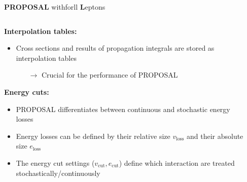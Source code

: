 \begin{frame}{}
  \vspace{-3cm}
  \begin{minipage}[t][1cm][t]{\textwidth}
  {\huge \textbf{PROPOSAL}} {\huge\textbf{\rightarrow}}
  \colorbox{tugreen}{}{\Large with}\colorbox{tugreen}{}{\Large for}\colorbox{tugreen}{ll {\huge \textbf{L}}{\Large eptons}}
  \end{minipage}
  \begin{minipage}[t][1cm][t]{\textwidth}
    \begin{columns}[onlytextwidth]
        \begin{column}{0.5\textwidth}
          \textbf{Interpolation tables:}
            \begin{itemize}
              \item Cross sections and results of propagation integrals are stored as interpolation tables
              \begin{itemize}
                \item[$\rightarrow$] Crucial for the performance of PROPOSAL
              \end{itemize}
            \end{itemize}
          \textbf{Energy cuts:}
          \begin{itemize}
            \item PROPOSAL differentiates between continuous and stochastic energy losses
            \item Energy losses can be defined by their relative size $v_\text{loss}$ and their absolute size $e_\text{loss}$
            \item The energy cut settings ($v_\text{cut}, e_\text{cut}$) define which interaction are treated stochastically/continuously
          \end{itemize}
        \end{column}
        \begin{column}{0.5\textwidth}


\end{column}
\end{columns}
\end{minipage}
\end{frame}
